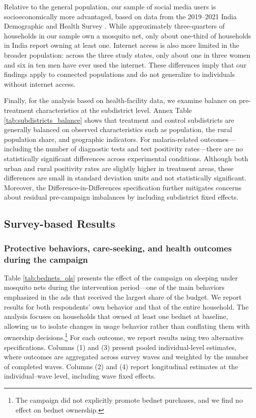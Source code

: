 Relative to the general population, our sample of social media users is socioeconomically more advantaged, based on data from the 2019--2021 India Demographic and Health Survey \citep{dhs2022}. While approximately three-quarters of households in our sample own a mosquito net, only about one-third of households in India report owning at least one. Internet access is also more limited in the broader population: across the three study states, only about one in three women and six in ten men have ever used the internet. These differences imply that our findings apply to connected populations and do not generalize to individuals without internet access.

Finally, for the analysis based on health-facility data, we examine balance on pre-treatment characteristics at the subdistrict level. Annex Table \ref{tab:subdistricts_balance} shows that treatment and control subdistricts are generally balanced on observed characteristics such as population, the rural population share, and geographic indicators. For malaria-related outcomes---including the number of diagnostic tests and test positivity rates---there are no statistically significant differences across experimental conditions. Although both urban and rural positivity rates are slightly higher in treatment areas, these differences are small in standard deviation units and not statistically significant. Moreover, the Difference-in-Differences specification further mitigates concerns about residual pre-campaign imbalances by including subdistrict fixed effects.

\subsection{Survey-based Results} \label{sec:servey_results}

\subsubsection{Protective behaviors, care-seeking, and health outcomes during the campaign}
Table \ref{tab:bednets_ols} presents the effect of the campaign on sleeping under mosquito nets during the intervention period---one of the main behaviors emphasized in the ads that received the largest share of the budget. We report results for both respondents’ own behavior and that of the entire household. The analysis focuses on households that owned at least one bednet at baseline, allowing us to isolate changes in usage behavior rather than conflating them with ownership decisions.\footnote{The campaign did not explicitly promote bednet purchases, and we find no effect on bednet ownership.}  For each outcome, we report results using two alternative specifications. Columns (1) and (3) present pooled individual-level estimates, where outcomes are aggregated across survey waves and weighted by the number of completed waves. Columns (2) and (4) report longitudinal estimates at the individual–wave level, including wave fixed effects. 

